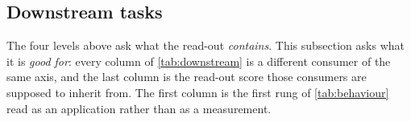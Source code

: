 \subsection{Downstream tasks}
\label{sec:exp_downstream}

The four levels above ask what the read-out \emph{contains}. This subsection
asks what it is \emph{good for}: every column of \cref{tab:downstream} is a
different consumer of the same axis, and the last column is the read-out score
those consumers are supposed to inherit from. The first column is the first
rung of \cref{tab:behaviour} read as an application rather than as a
measurement.

%
%
%

